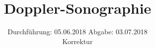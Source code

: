 

\subject{US-3}
\title{Doppler-Sonographie}
\date{%
  Durchführung: 05.06.2018
  \hspace{3em}
  Abgabe: 03.07.2018 \\
  Korrektur
}



\maketitle
\thispagestyle{empty}
\tableofcontents
\newpage






\printbibliography{}


